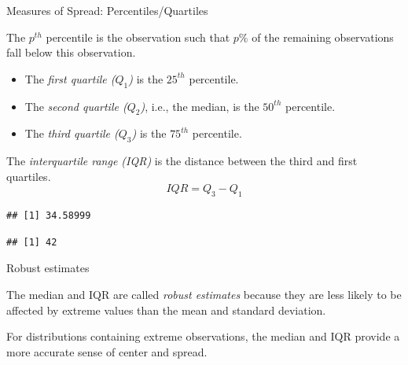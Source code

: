 \documentclass[
  ignorenonframetext,
]{beamer}
\newenvironment{Shaded}{\begin{snugshade}}{\end{snugshade}}
\newcommand{\KeywordTok}[1]{\textcolor[rgb]{0.13,0.29,0.53}{\textbf{#1}}}
\newcommand{\NormalTok}[1]{#1}
\newcommand{\OperatorTok}[1]{\textcolor[rgb]{0.81,0.36,0.00}{\textbf{#1}}}
\providecommand{\tightlist}{%
  \setlength{\itemsep}{0pt}\setlength{\parskip}{0pt}}
\begin{document}
\begin{frame}[fragile]{Measures of Spread: Percentiles/Quartiles}
\protect\hypertarget{measures-of-spread-percentilesquartiles}{}

The \(p^{th}\) percentile is the observation such that \(p\%\) of the
remaining observations fall below this observation.

\begin{itemize}
\tightlist
\item
  The \emph{first quartile (\(Q_1\))} is the \(25^{th}\) percentile.
\item
  The \emph{second quartile (\(Q_2\))}, i.e., the median, is the
  \(50^{th}\) percentile.
\item
  The \emph{third quartile (\(Q_3\))} is the \(75^{th}\) percentile.
\end{itemize}

The \emph{interquartile range (IQR)} is the distance between the third
and first quartiles. \[IQR = Q_3 - Q_1 \]

\footnotesize

\scriptsize

\begin{Shaded}
\end{Shaded}

\begin{verbatim}
## [1] 34.58999
\end{verbatim}

\begin{Shaded}
\end{Shaded}

\begin{verbatim}
## [1] 42
\end{verbatim}

\normalsize

\end{frame}

\begin{frame}{Robust estimates}
\protect\hypertarget{robust-estimates}{}

The median and IQR are called \emph{robust estimates} because they are
less likely to be affected by extreme values than the mean and standard
deviation.

For distributions containing extreme observations, the median and IQR
provide a more accurate sense of center and spread.

\end{frame}
\end{document}
